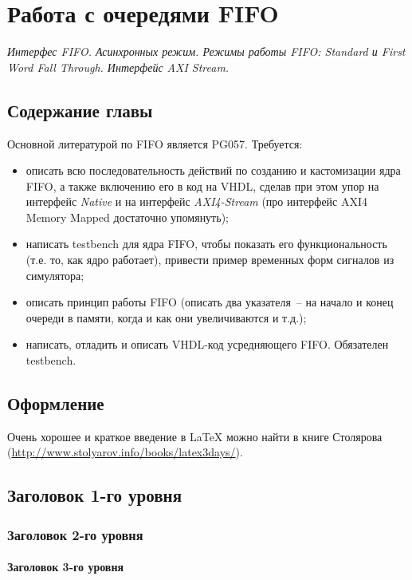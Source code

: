 \chapter{Работа с очередями FIFO}

\emph{Интерфес FIFO. Асинхронных режим. Режимы работы FIFO: Standard и First Word Fall Through. Интерфейс AXI Stream.}

\section{Содержание главы}

Основной литературой по FIFO является PG057. Требуется:
\begin{itemize}
\item описать всю последовательность действий по созданию и кастомизации ядра FIFO, а также включению его в код на VHDL, сделав при этом упор на интерфейс \emph{Native} и на интерфейс \emph{AXI4-Stream} (про интерфейс AXI4 Memory Mapped достаточно упомянуть);
\item написать testbench для ядра FIFO, чтобы показать его функциональность (т.е. то, как ядро работает), привести пример временных форм сигналов из симулятора;
\item описать принцип работы FIFO (описать два указателя~-- на начало и конец очереди в памяти, когда и как они увеличиваются и т.д.);
\item написать, отладить и описать VHDL-код усредняющего FIFO. Обязателен testbench.
\end{itemize}

\section{Оформление}

Очень хорошее и краткое введение в LaTeX можно найти в книге Столярова (\href{url}{http://www.stolyarov.info/books/latex3days/}).

\section{Заголовок 1-го уровня}
\subsection{Заголовок 2-го уровня}
\subsubsection{Заголовок 3-го уровня}

